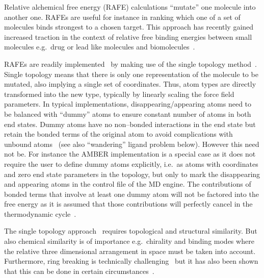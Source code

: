 \documentclass[journal=jctcce,manuscript=article]{achemso}
\begin{document}
Relative alchemical free energy (RAFE) calculations ``mutate'' one
molecule into another one.  RAFEs are useful for instance in ranking which one 
of a set of molecules binds strongest to a chosen target.  This approach has 
recently gained increased traction in the context of relative free binding 
energies between small molecules e.g.\ drug or lead like molecules and 
biomolecules~\cite{doi:10.1021/ja512751q, 
doi:10.1021/acs.jctc.6b00991}.

RAFEs are readily implemented~\cite{doi:10.1021/j100056a020, Michel2010} by 
making use of the single topology method~\cite{doi:10.1063/1.449208,
doi:10.1021/j100056a020, doi:10.1021/jp981628n}.  Single topology means that 
there is only one representation of the molecule to be mutated, also implying a 
single set of coordinates.
Thus, atom types are directly transformed into the new type,
typically by linearly scaling the force field parameters.
In typical implementations, disappearing/appearing atoms need to be balanced with ``dummy'' atoms to ensure 
constant number of atoms in both end states.  Dummy atoms have no non--bonded 
interactions in the end state but retain the bonded terms of the original atom 
to avoid complications with unbound atoms~\cite{doi:10.1021/jp981628n} (see 
also ``wandering'' ligand problem below).  However this need not be. 
For instance the AMBER implementation 
is a special case as it does not require the user to define dummy atoms 
explicitly, i.e.\ as atoms with coordinates and zero end state parameters in 
the topology, but only 
to mark the disappearing and appearing atoms in the control file of the 
MD engine.  The contributions of bonded terms that involve at least one 
dummy atom will not be factored into the free energy as it is assumed that 
those contributions will perfectly cancel in the thermodynamic 
cycle~\cite{doi:10.1021/acs.jcim.5b00057, doi:10.1021/jp994193s}.

The single topology approach~\cite{doi:10.1021/j100056a020} requires
topological and structural similarity.
But also chemical similarity is of importance e.g.\ chirality and binding modes 
where the relative three dimensional arrangement in space must be taken into 
account.  Furthermore, ring breaking is technically
challenging~\cite{doi:10.1021/acs.jctc.6b00991} but it has also been
shown that this can be done in certain 
circumstances~\cite{doi:10.1021/acs.jcim.5b00057,
  doi:10.1021/jp994193s}.
\end{document}
